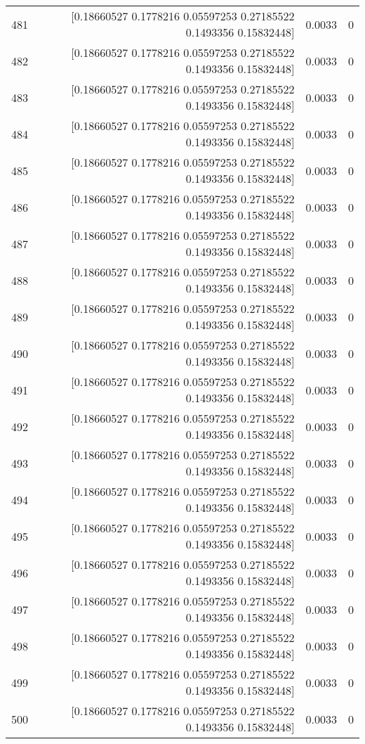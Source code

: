 \begin{longtable}{lrrr}
481 & [0.18660527 0.1778216  0.05597253 0.27185522 0.1493356  0.15832448] & 0.0033 & 0 \\
482 & [0.18660527 0.1778216  0.05597253 0.27185522 0.1493356  0.15832448] & 0.0033 & 0 \\
483 & [0.18660527 0.1778216  0.05597253 0.27185522 0.1493356  0.15832448] & 0.0033 & 0 \\
484 & [0.18660527 0.1778216  0.05597253 0.27185522 0.1493356  0.15832448] & 0.0033 & 0 \\
485 & [0.18660527 0.1778216  0.05597253 0.27185522 0.1493356  0.15832448] & 0.0033 & 0 \\
486 & [0.18660527 0.1778216  0.05597253 0.27185522 0.1493356  0.15832448] & 0.0033 & 0 \\
487 & [0.18660527 0.1778216  0.05597253 0.27185522 0.1493356  0.15832448] & 0.0033 & 0 \\
488 & [0.18660527 0.1778216  0.05597253 0.27185522 0.1493356  0.15832448] & 0.0033 & 0 \\
489 & [0.18660527 0.1778216  0.05597253 0.27185522 0.1493356  0.15832448] & 0.0033 & 0 \\
490 & [0.18660527 0.1778216  0.05597253 0.27185522 0.1493356  0.15832448] & 0.0033 & 0 \\
491 & [0.18660527 0.1778216  0.05597253 0.27185522 0.1493356  0.15832448] & 0.0033 & 0 \\
492 & [0.18660527 0.1778216  0.05597253 0.27185522 0.1493356  0.15832448] & 0.0033 & 0 \\
493 & [0.18660527 0.1778216  0.05597253 0.27185522 0.1493356  0.15832448] & 0.0033 & 0 \\
494 & [0.18660527 0.1778216  0.05597253 0.27185522 0.1493356  0.15832448] & 0.0033 & 0 \\
495 & [0.18660527 0.1778216  0.05597253 0.27185522 0.1493356  0.15832448] & 0.0033 & 0 \\
496 & [0.18660527 0.1778216  0.05597253 0.27185522 0.1493356  0.15832448] & 0.0033 & 0 \\
497 & [0.18660527 0.1778216  0.05597253 0.27185522 0.1493356  0.15832448] & 0.0033 & 0 \\
498 & [0.18660527 0.1778216  0.05597253 0.27185522 0.1493356  0.15832448] & 0.0033 & 0 \\
499 & [0.18660527 0.1778216  0.05597253 0.27185522 0.1493356  0.15832448] & 0.0033 & 0 \\
500 & [0.18660527 0.1778216  0.05597253 0.27185522 0.1493356  0.15832448] & 0.0033 & 0 \\
\end{longtable}